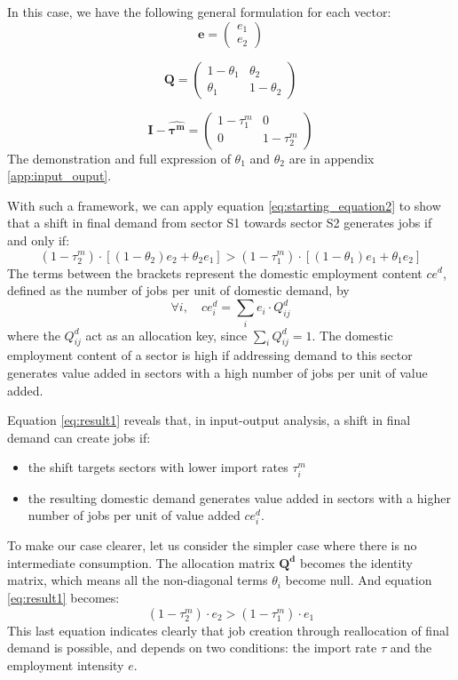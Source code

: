 In this case, we have the following general formulation for each vector:
$$ \pmb{e} =
\begin{pmatrix} 
e_1 \\
e_2
\end{pmatrix}
$$

$$ \pmb{Q} =
\begin{pmatrix} 
1-\theta_1 & \theta_2\\
\theta_1 & 1-\theta_2
\end{pmatrix}
$$

$$ \pmb{I} - \pmb{\widehat{\tau^m}} =
\begin{pmatrix} 
1-\tau^m_1 & 0\\
0 & 1-\tau^m_2
\end{pmatrix}
$$
The demonstration and full expression of $\theta_1$ and $\theta_2$ are in appendix \ref{app:input_ouput}. 

With such a framework, we can apply equation \ref{eq:starting_equation2} to show that a shift in final demand from sector S1 towards sector S2 generates jobs if and only if:
\begin{equation}
\label{eq:result1}
(1-\tau^m_2) \cdot \left[(1-\theta_2)e_2 + \theta_2 e_1 \right]> (1-\tau^m_1) \cdot \left[ (1-\theta_1)e_1 + \theta_1 e_2 \right]
\end{equation}
The terms between the brackets represent the domestic employment content  $ce^d$, defined as the number of jobs per unit of domestic demand, by 
$$\forall i, \quad ce^d_i = \sum_i e_i \cdot Q^d_{ij}$$
where the $Q^d_{ij}$ act as an allocation key, since $\sum_i Q^d_{ij}= 1$.
The domestic employment content of a sector is high if addressing demand to this sector generates value added in sectors with a high number of jobs per unit of value added.

Equation \ref{eq:result1} reveals that, in input-output analysis, a shift in final demand can create jobs if:
\begin{itemize}
	\item the shift targets sectors with lower import rates $\tau^m_i$
	\item the resulting domestic demand generates value added in sectors with a higher number of jobs per unit of value added $ce^d_i$. 
\end{itemize}	

To make our case clearer, let us consider the simpler case where there is no intermediate consumption. The allocation matrix $\pmb{Q^d}$ becomes the identity matrix, which means all the non-diagonal terms $\theta_i$ become null. And equation \ref{eq:result1} becomes:
\begin{equation}
(1-\tau^m_2) \cdot e_2 > (1-\tau^m_1) \cdot e_1
\label{eq:result1_simplified}
\end{equation}
This last equation indicates clearly that job creation through reallocation of final demand is possible, and depends on two conditions: the import rate $\tau$ and the employment intensity $e$. 

